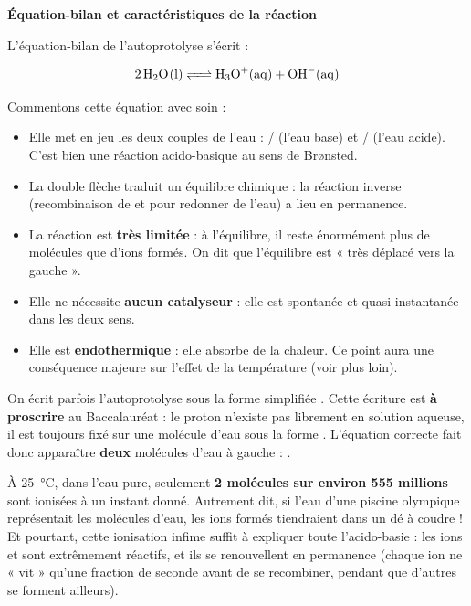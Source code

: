 \documentclass[11pt]{article}
\newcommand{\cle}[1]{{\popxbold\color{popdark}#1}}
\begin{document}
\textbf{Équation-bilan et caractéristiques de la réaction}\par

L'équation-bilan de l'autoprotolyse s'écrit :

\[ \ce{2 H2O(l) <=> H3O+(aq) + OH-(aq)} \]

Commentons cette équation avec soin :
\begin{itemize}
\item Elle met en jeu les deux couples de l'eau : / (l'eau base) et / (l'eau acide). C'est bien une réaction acido-basique au sens de Brønsted.
\item La double flèche \ce{<=>} traduit un \cle{équilibre chimique} : la réaction inverse (recombinaison de  et  pour redonner de l'eau) a lieu en permanence.
\item La réaction est \textbf{très limitée} : à l'équilibre, il reste énormément plus de molécules  que d'ions formés. On dit que l'équilibre est « très déplacé vers la gauche ».
\item Elle ne nécessite \textbf{aucun catalyseur} : elle est spontanée et quasi instantanée dans les deux sens.
\item Elle est \textbf{endothermique} : elle absorbe de la chaleur. Ce point aura une conséquence majeure sur l'effet de la température (voir plus loin).
\end{itemize}

\begin{attention}
On écrit parfois l'autoprotolyse sous la forme simplifiée . Cette écriture est \textbf{à proscrire} au Baccalauréat : le proton  n'existe pas librement en solution aqueuse, il est toujours fixé sur une molécule d'eau sous la forme . L'équation correcte fait donc apparaître \textbf{deux} molécules d'eau à gauche : .
\end{attention}

\begin{savaistu}
À \SI{25}{\celsius}, dans l'eau pure, seulement \textbf{2 molécules sur environ 555 millions} sont ionisées à un instant donné. Autrement dit, si l'eau d'une piscine olympique représentait les molécules d'eau, les ions formés tiendraient dans un dé à coudre ! Et pourtant, cette ionisation infime suffit à expliquer toute l'acido-basie : les ions  et  sont extrêmement réactifs, et ils se renouvellent en permanence (chaque ion ne « vit » qu'une fraction de seconde avant de se recombiner, pendant que d'autres se forment ailleurs).
\end{savaistu}
\end{document}

